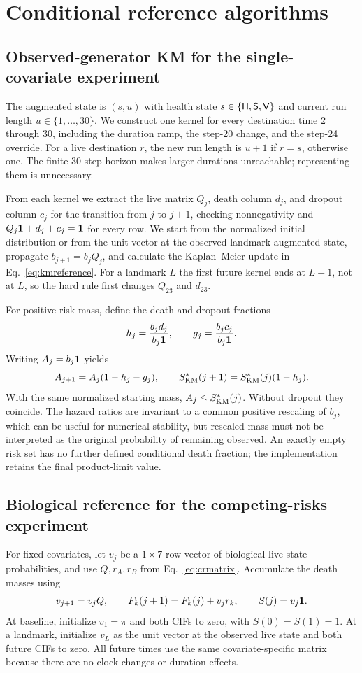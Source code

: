 \section{Conditional reference algorithms}\label{app:truth}
\subsection{Observed-generator KM for the single-covariate experiment}
The augmented state is $(s,u)$ with health state $s\in\{\mathsf H,\mathsf S,\mathsf V\}$ and current run length $u\in\{1,\ldots,30\}$. We construct one kernel for every destination time 2 through 30, including the duration ramp, the step-20 change, and the step-24 override. For a live destination $r$, the new run length is $u+1$ if $r=s$, otherwise one. The finite 30-step horizon makes larger durations unreachable; representing them is unnecessary.

From each kernel we extract the live matrix $Q_j$, death column $d_j$, and dropout column $c_j$ for the transition from $j$ to $j+1$, checking nonnegativity and $Q_j\mathbf 1+d_j+c_j=\mathbf 1$ for every row. We start from the normalized initial distribution or from the unit vector at the observed landmark augmented state, propagate $b_{j+1}=b_jQ_j$, and calculate the Kaplan--Meier update in Eq.~\eqref{eq:kmreference}. For a landmark $L$ the first future kernel ends at $L+1$, not at $L$, so the hard rule first changes $Q_{23}$ and $d_{23}$.

For positive risk mass, define the death and dropout fractions
\[
h_j=\frac{b_jd_j}{b_j\mathbf 1},\qquad g_j=\frac{b_jc_j}{b_j\mathbf 1}.
\]
Writing $A_j=b_j\mathbf 1$ yields
\[
A_{j+1}=A_j(1-h_j-g_j),\qquad S^*_{\rm KM}(j+1)=S^*_{\rm KM}(j)(1-h_j).
\]
With the same normalized starting mass, $A_j\le S^*_{\rm KM}(j)$. Without dropout they coincide. The hazard ratios are invariant to a common positive rescaling of $b_j$, which can be useful for numerical stability, but rescaled mass must not be interpreted as the original probability of remaining observed. An exactly empty risk set has no further defined conditional death fraction; the implementation retains the final product-limit value.

\subsection{Biological reference for the competing-risks experiment}
For fixed covariates, let $v_j$ be a $1\times7$ row vector of biological live-state probabilities, and use $Q,r_A,r_B$ from Eq.~\eqref{eq:crmatrix}. Accumulate the death masses using
\begin{equation}\label{eq:dp}
v_{j+1}=v_jQ,\qquad
F_k(j+1)=F_k(j)+v_jr_k,\qquad S(j)=v_j\mathbf 1.
\end{equation}
At baseline, initialize $v_1=\pi$ and both CIFs to zero, with $S(0)=S(1)=1$. At a landmark, initialize $v_L$ as the unit vector at the observed live state and both future CIFs to zero. All future times use the same covariate-specific matrix because there are no clock changes or duration effects.

